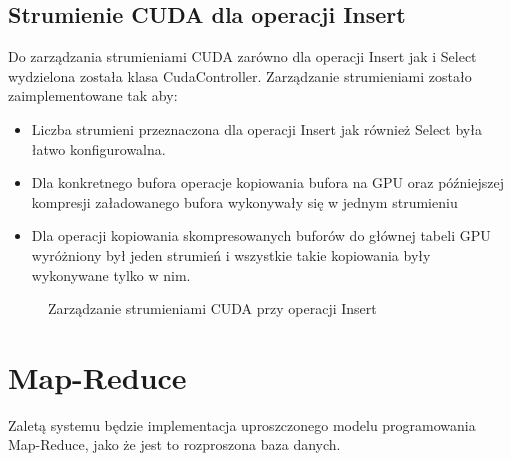 \documentclass[paper=a4, fontsize=11pt]{scrartcl} %
\numberwithin{equation}{section} %
\numberwithin{figure}{section} %
\numberwithin{table}{section} %
\begin{document}
		\clearpage

	\subsection{Strumienie CUDA dla operacji Insert}
		Do zarządzania strumieniami CUDA zarówno dla operacji Insert jak i Select wydzielona została klasa CudaController. Zarządzanie strumieniami zostało zaimplementowane tak aby:
		\begin{itemize}
			\item Liczba strumieni przeznaczona dla operacji Insert jak również Select była łatwo konfigurowalna. 
			\item Dla konkretnego bufora operacje kopiowania bufora na GPU oraz późniejszej kompresji załadowanego bufora wykonywały się w jednym strumieniu
			\item Dla operacji kopiowania skompresowanych buforów do głównej tabeli GPU wyróżniony był jeden strumień i wszystkie takie kopiowania były wykonywane tylko w nim.
		\end{itemize}
		\begin{figure}[t]
			\begin{center}
				\caption{Zarządzanie strumieniami CUDA przy operacji Insert}
			\end{center}
		\end{figure}
		\clearpage

\section{Map-Reduce}
Zaletą systemu będzie implementacja uproszczonego modelu programowania Map-Reduce, jako że jest to rozproszona baza danych.
\end{document}
